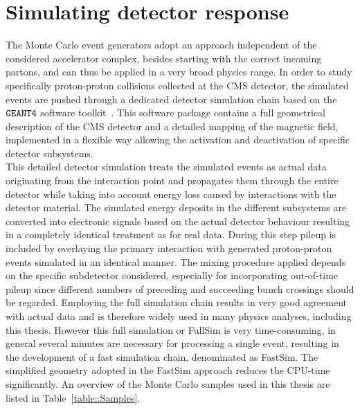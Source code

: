 \section{Simulating detector response} \label{sec::DetectorSim} %
The Monte Carlo event generators adopt an approach independent of the considered accelerator complex, besides starting with the correct incoming partons, and can thus be applied in a very broad physics range. In order to study specifically proton-proton collisions collected at the CMS detector, the simulated events are pushed through a dedicated detector simulation chain based on the $\texttt{GEANT4}$ software toolkit~\cite{Geant4}. This software package contains a full geometrical description of the CMS detector and a detailed mapping of the magnetic field, implemented in a flexible way allowing the activation and deactivation of specific detector subsystems.
\\
This detailed detector simulation treats the simulated events as actual data originating from the interaction point and propagates them through the entire detector while taking into account energy loss caused by interactions with the detector material. 
The simulated energy deposits in the different subsystems are converted into electronic signals based on the actual detector behaviour resulting in a completely identical treatment as for real data.
During this step pileup is included by overlaying the primary interaction with generated proton-proton events simulated in an identical manner. 
The mixing procedure applied depends on the specific subdetector considered, especially for incorporating out-of-time pileup since different numbers of preceding and succeeding bunch crossings should be regarded.
Employing the full simulation chain results in very good agreement with actual data and is therefore widely used in many physics analyses, including this thesis. However this full simulation or FullSim is very time-consuming, in general several minutes are necessary for processing a single event, resulting in the development of a fast simulation chain, denominated as FastSim. 
The simplified geometry adopted in the FastSim approach reduces the CPU-time significantly. %
An overview of the Monte Carlo samples used in this thesis are listed in Table~\ref{table::Samples}.

